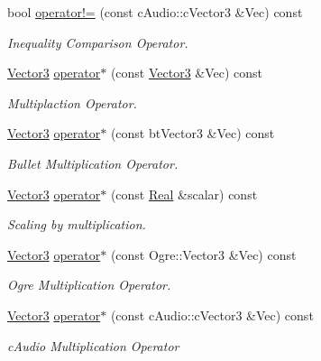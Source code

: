 \begin{DoxyCompactItemize}
bool \hyperlink{classMezzanine_1_1Vector3_a8888d70d5fb5d3a1aebb458d14da9ad1}{operator!=} (const cAudio::cVector3 \&Vec) const 
\begin{DoxyCompactList}\small\item\em Inequality Comparison Operator. \item\end{DoxyCompactList}\item 
\hyperlink{classMezzanine_1_1Vector3}{Vector3} \hyperlink{classMezzanine_1_1Vector3_a5d950bff38f35d01f31178b9a281bfca}{operator$\ast$} (const \hyperlink{classMezzanine_1_1Vector3}{Vector3} \&Vec) const 
\begin{DoxyCompactList}\small\item\em Multiplaction Operator. \item\end{DoxyCompactList}\item 
\hyperlink{classMezzanine_1_1Vector3}{Vector3} \hyperlink{classMezzanine_1_1Vector3_ad7edefd69b1197070e01db7e6e744af6}{operator$\ast$} (const btVector3 \&Vec) const 
\begin{DoxyCompactList}\small\item\em Bullet Multiplication Operator. \item\end{DoxyCompactList}\item 
\hyperlink{classMezzanine_1_1Vector3}{Vector3} \hyperlink{classMezzanine_1_1Vector3_ad72a28353c1aa60815050f803bc61ae0}{operator$\ast$} (const \hyperlink{namespaceMezzanine_a726731b1a7df72bf3583e4a97282c6f6}{Real} \&scalar) const 
\begin{DoxyCompactList}\small\item\em Scaling by multiplication. \item\end{DoxyCompactList}\item 
\hyperlink{classMezzanine_1_1Vector3}{Vector3} \hyperlink{classMezzanine_1_1Vector3_ae6ab1b08614f2105a61584999c3f2339}{operator$\ast$} (const Ogre::Vector3 \&Vec) const 
\begin{DoxyCompactList}\small\item\em Ogre Multiplication Operator. \item\end{DoxyCompactList}\item 
\hyperlink{classMezzanine_1_1Vector3}{Vector3} \hyperlink{classMezzanine_1_1Vector3_ad9291ea4ef98128c77a2acdb98eade87}{operator$\ast$} (const cAudio::cVector3 \&Vec) const 
\begin{DoxyCompactList}\small\item\em cAudio Multiplication Operator \item\end{DoxyCompactList}\item 

\end{DoxyCompactItemize}
